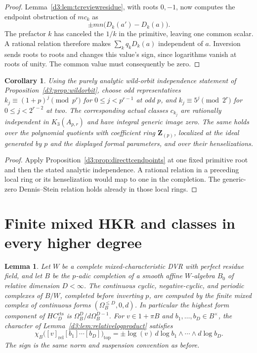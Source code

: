 \documentclass[11pt,a4paper]{amsart}
\numberwithin{equation}{section}
\newtheorem{lemma}[theorem]{Lemma}
\newtheorem{corollary}[theorem]{Corollary}
\theoremstyle{definition}
\theoremstyle{remark}
\begin{document}
\begin{proof}
Lemma~\ref{d3:lem:tcreviewresidue}, with roots $0,-1$, now computes the
endpoint obstruction of $mc_k$ as
\[
          \pm mn\bigl(D_k(a')-D_k(a)\bigr).
\]
The prefactor $k$ has canceled the $1/k$ in the primitive, leaving
one common scalar. A rational relation therefore makes
$\sum_kq_kD_k(a)$ independent of $a$. Inversion sends roots to
roots and changes this value's sign, since logarithms vanish at
roots of unity. The common value must consequently be zero.
\end{proof}

\begin{corollary}\label{d3:cor:directtcwildorbit}
Using the purely analytic wild-orbit independence statement of
Proposition~\ref{d3:prop:wildorbit}, choose odd representatives
$k_j\equiv(1+p)^j\pmod{p^r}$ for $0\le j<p^{r-1}$ at odd $p$,
and $k_j\equiv5^j\pmod{2^r}$ for $0\le j<2^{r-2}$ at two.
The corresponding actual classes $c_{k_j}$ are rationally independent
in $K_3(A_{p,r})$ and have integral generic image zero.
The same holds over the polynomial quotients with coefficient ring
$\mathbf Z_{(p)}$, localized at the ideal generated by $p$ and the
displayed formal parameters, and over their henselizations.
\end{corollary}
\begin{proof}
Apply Proposition~\ref{d3:prop:directtcendpoints} at one fixed primitive
root and then the stated analytic independence. A rational relation
in a preceding local ring or its henselization would map to one in
the completion. The generic-zero Dennis--Stein relation holds already
in those local rings.
\end{proof}


\section{Finite mixed HKR and classes in every higher degree}
\label{d3:sec:allhigherdegreelaurent}

\begin{lemma}
\label{d3:lem:finitehkrgeneral}
Let $W$ be a complete mixed-characteristic DVR with perfect residue
field, and let $B$ be the $p$-adic completion of a smooth affine
$W$-algebra $B_0$ of relative dimension $D<\infty$.
The continuous cyclic, negative-cyclic, and periodic complexes of
$B/W$, completed before inverting $p$, are computed by the finite
mixed complex of continuous forms $(\Omega_B^{\leq D},0,d)$.
In particular the highest form component of $HC_D^{\mathrm{cts}}$
is $\Omega_B^D/d\Omega_B^{D-1}$.
For $v\in1+\pi B$ and $b_1,\ldots,b_D\in B^\times$, the character
of Lemma~\ref{d3:lem:relativelogproduct} satisfies
\[
 \chi_B\bigl([v]_{\mathrm{rel}}[b_1]\cdots[b_D]\bigr)_{\mathrm{top}}
 =\pm\log(v)\,d\log b_1\wedge\cdots\wedge d\log b_D.
\]
The sign is the same norm and suspension convention as before.
\end{lemma}
\end{document}
